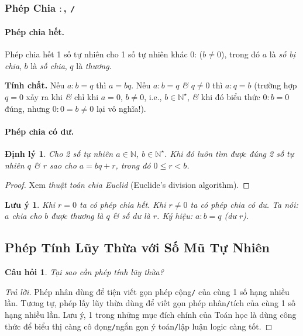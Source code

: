 \documentclass{article}
\numberwithin{equation}{section}
\newtheorem{cauhoi}{Câu hỏi}[section]
\newtheorem{luuy}{Lưu ý}[section]
\newtheorem{dinhly}{Định lý}[section]
\begin{document}
\subsubsection{Phép Chia $:$, \texttt{/}}

\paragraph{Phép chia hết.} Phép chia hết 1 số tự nhiên cho 1 số tự nhiên khác 0:  ($b\ne 0$), trong đó $a$ là \textit{số bị chia}, $b$ là \textit{số chia}, $q$ là \textit{thương}.

\noindent\textbf{Tính chất.} Nếu $a:b = q$ thì $a = bq$. Nếu $a:b = q$ \textit{\&} $q\ne 0$ thì $a:q = b$ (trường hợp $q = 0$ xảy ra khi \textit{\&} chỉ khi $a = 0$, $b\ne 0$, i.e., $b\in\mathbb{N}^\star$, \textit{\&} khi đó biểu thức $0:b = 0$ đúng, nhưng $0:0 = b\ne 0$ lại vô nghĩa!).

\paragraph{Phép chia có dư.}
\begin{dinhly}
	Cho 2 số tự nhiên $a\in\mathbb{N}$, $b\in\mathbb{N}^\star$. Khi đó luôn tìm được đúng 2 số tự nhiên $q$ \textit{\&} $r$ sao cho $a = bq + r$, trong đó $0\le r < b$.
\end{dinhly}

\begin{proof}[Proof]
	Xem \textit{thuật toán chia Euclid} (Euclide's division algorithm).
\end{proof}

\begin{luuy}
	Khi $r = 0$ ta có phép chia hết. Khi $r\ne 0$ ta có phép chia có dư. Ta nói: $a$ chia cho $b$ được thương là $q$ \textit{\&} số dư là $r$. Ký hiệu: $a:b = q$ (dư $r$).
\end{luuy}


\subsection{Phép Tính Lũy Thừa với Số Mũ Tự Nhiên}

\begin{cauhoi}
	Tại sao cần phép tính lũy thừa?
\end{cauhoi}

\begin{proof}[Trả lời]
	Phép nhân dùng để tiện viết gọn phép cộng\texttt{/} của cùng 1 số hạng nhiều lần. Tương tự, phép lấy lũy thừa dùng để viết gọn phép nhân\texttt{/}tích của cùng 1 số hạng nhiều lần. Lưu ý, 1 trong những mục đích chính của Toán học là dùng công thức để biểu thị càng cô đọng\texttt{/}ngắn gọn ý toán\texttt{/}lập luận logic càng tốt.
\end{proof}
\end{document}
